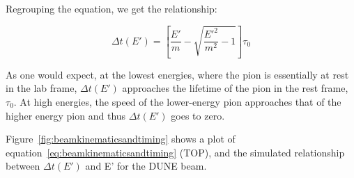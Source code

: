 Regrouping the equation, we get the relationship:

\begin{equation}
\Delta t(E') = \left[\frac{E'}{m} - \sqrt{ \frac{E'^2}{m^2} - 1}\right] \tau_0
\label{eq:beamkinematicsandtiming}
\end{equation}

As one would expect, at the lowest energies, where the pion is
essentially at rest in the lab frame, $\Delta t(E')$ approaches the
lifetime of the pion in the rest frame, $\tau_0$. At high energies,
the speed of the lower-energy pion approaches that of the higher
energy pion and thus $\Delta t(E')$ goes to zero.

Figure~\ref{fig:beamkinematicsandtiming} shows a plot of
equation~\ref{eq:beamkinematicsandtiming} (TOP), and the simulated
relationship between $\Delta t(E')$ and E' for the DUNE beam.

